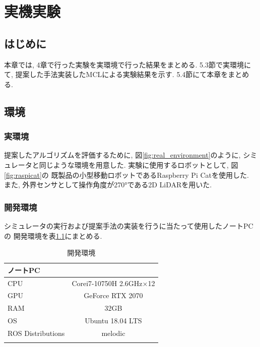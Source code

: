 \chapter{実機実験}\label{chap:practical_experiment}

\section{はじめに}
本章では, 4章で行った実験を実環境で行った結果をまとめる. 
5.3節で実環境にて, 提案した手法実装したMCLによる実験結果を示す. 
5.4節にて本章をまとめる.

\section{環境}

\subsection{実環境}

提案したアルゴリズムを評価するために, 図\ref{fig:real_environment}のように, 
シミュレータと同じような環境を用意した. 実験に使用するロボットとして, 図\ref{fig:raspicat}の
既製品の小型移動ロボットであるRaspberry Pi Catを使用した. 
また, 外界センサとして操作角度が270°である2D LiDAR\cite{UST-30LX}を用いた. 

\subsection{開発環境}

シミュレータの実行および提案手法の実装を行うに当たって使用したノートPCの
開発環境を表\ref{tabule:pc_spec_real}にまとめる. 

\begin{table}[ht]
  \caption{開発環境}
  \label{tabule:pc_spec_real}
  \begin{center}
    \begin{tabular}{l|c} 
      \thline
      ノートPC & \\
      \hline
      CPU & Corei7-10750H 2.6GHz×12 \\
      GPU & GeForce RTX 2070 \\
      RAM & 32GB \\
      OS & Ubuntu 18.04 LTS \\
      ROS Distributions & melodic \\ 
      \thline
    \end{tabular}
  \end{center}
\end{table}


